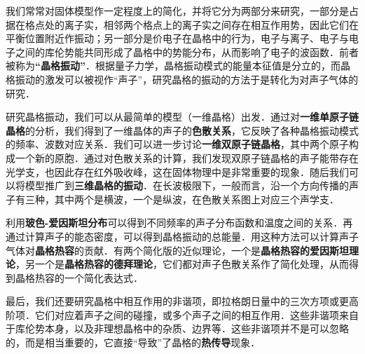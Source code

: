 
我们常常对固体模型作一定程度上的简化，并将它分为两部分来研究，一部分是占据在格点处的离子实，相邻两个格点上的离子实之间存在相互作用势，因此它们在平衡位置附近作振动；另一部分是价电子在晶格中的行为，电子与离子、电子与电子之间的库伦势能共同形成了晶格中的势能分布，从而影响了电子的波函数．前者被称为\textbf{“晶格振动”}．根据量子力学，晶格振动模式的能量本征值是分立的，而晶格振动的激发可以被视作“声子”，研究晶格的振动的方法于是转化为对声子气体的研究．

研究晶格振动，我们可以从最简单的模型（一维晶格）出发．通过对\textbf{一维单原子链晶格}的分析，我们得到了一维晶体的声子的\textbf{色散关系}，它反映了各种晶格振动模式的频率、波数对应关系．我们可以进一步讨论\textbf{一维双原子链晶格}，其中两个原子构成一个新的原胞．通过对色散关系的计算，我们发现双原子链晶格的声子能带存在光学支，也因此存在红外吸收峰，这在固体物理中是非常重要的现象．随后我们可以将模型推广到\textbf{三维晶格的振动}．在长波极限下，一般而言，沿一个方向传播的声子有三种，其中两个是横波，一个是纵波，在色散关系图上对应三个声学支．

利用\textbf{玻色-爱因斯坦分布}可以得到不同频率的声子分布函数和温度之间的关系．再通过计算声子的能态密度，可以得到晶格振动的总能量．用这种方法可以计算声子气体对\textbf{晶格热容}的贡献．有两个简化版的近似理论，一个是\textbf{晶格热容的爱因斯坦理论}，另一个是\textbf{晶格热容的德拜理论}，它们都对声子色散关系作了简化处理，从而得到晶格热容的一个简化表达式．

最后，我们还要研究晶格中相互作用的非谐项，即拉格朗日量中的三次方项或更高阶项．它们对应着声子之间的碰撞，或多个声子之间的相互作用．这些非谐项来自于库伦势本身，以及非理想晶格中的杂质、边界等．这些非谐项并不是可以忽略的，而是相当重要的，它直接“导致”了晶格的\textbf{热传导}现象．